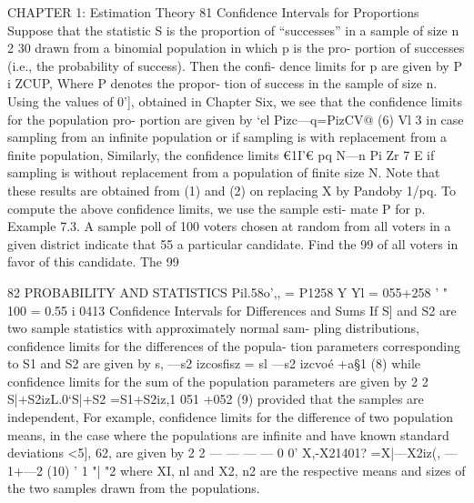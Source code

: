 CHAPTER 1: Estimation Theory 81
Confidence Intervals for Proportions
Suppose that the statistic S is the proportion of “successes” in a sample
of size n 2 30 drawn from a binomial population in which p is the pro-
portion of successes (i.e., the probability of success). Then the conﬁ-
dence limits for p are given by P i ZCUP, Where P denotes the propor-
tion of success in the sample of size n. Using the values of 0'], obtained
in Chapter Six, we see that the conﬁdence limits for the population pro-
portion are given by
‘el
Pizc\»—q=PizCV@ (6)
Vl
3
in case sampling from an inﬁnite population or if sampling is with
replacement from a ﬁnite population, Similarly, the conﬁdence limits
€1I'€
pq N—n
Pi Zr 7 E 
if sampling is without replacement from a population of ﬁnite size N.
Note that these results are obtained from (1) and (2) on replacing X by
Pandoby 1/pq.
To compute the above conﬁdence limits, we use the sample esti-
mate P for p.
Example 7.3. A sample poll of 100 voters chosen at random from
all voters in a given district indicate that 55%
a particular candidate. Find the 99%
of all voters in favor of this candidate.
The 99%



82 PROBABILITY AND STATISTICS
Pil.58o',, = P1258 Y
Yl
= 055+258  
' " 100
= 0.55 i 0413
Confidence Intervals for
Differences and Sums
If S] and S2 are two sample statistics with approximately normal sam-
pling distributions, conﬁdence limits for the differences of the popula-
tion parameters corresponding to S1 and S2 are given by
s, —s2 izcosﬁsz = sl —s2 izcvoé +a§1 (8)
while conﬁdence limits for the sum of the population parameters are
given by
2 2
S|+S2izL.0‘S|+S2 =S1+S2iz,1 051 +052 (9)
provided that the samples are independent,
For example, conﬁdence limits for the difference of two population
means, in the case where the populations are inﬁnite and have known
standard deviations <5], 62, are given by
2 2
— — — — 0 0'
X,-X21401? =X|—X2iz(, —1+—2 (10)
' 1 "| "2
where XI, nl and X2, n2 are the respective means and sizes of the two
samples drawn from the populations.



